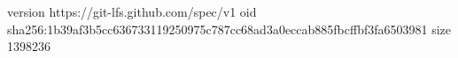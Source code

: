version https://git-lfs.github.com/spec/v1
oid sha256:1b39af3b5cc636733119250975c787cc68ad3a0eccab885fbcffbf3fa6503981
size 1398236
